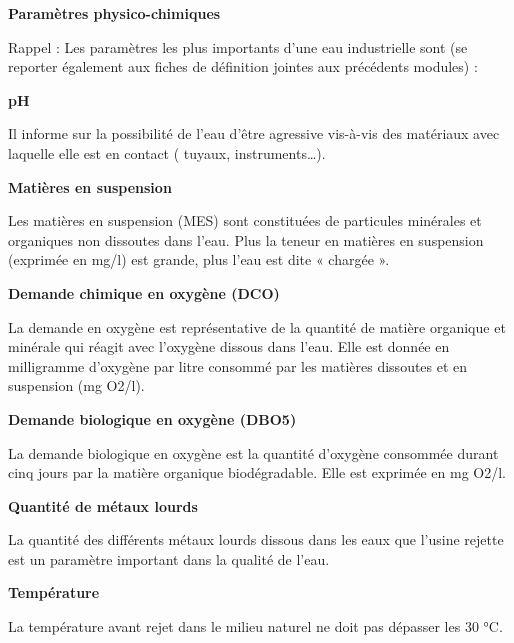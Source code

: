 \vspace{0.3cm}
\textbf{Paramètres physico-chimiques}
\vspace{0.3cm}

Rappel : Les paramètres les plus importants d’une eau industrielle sont (se reporter également aux fiches de définition jointes aux précédents modules) : 

\vspace{0.3cm}
\textbf{pH}
\vspace{0.3cm}

Il informe sur la possibilité de l’eau d’être agressive vis-à-vis des matériaux avec laquelle elle est en contact ( tuyaux, instruments…).


\vspace{0.3cm}
\textbf{Matières en suspension} 
\vspace{0.3cm}

Les matières en suspension (MES) sont constituées de particules minérales et organiques non dissoutes dans l’eau. Plus la teneur en matières en suspension (exprimée en mg/l) est grande, plus l’eau est dite « chargée ».

\vspace{0.3cm}
\textbf{Demande chimique en oxygène (DCO)}
\vspace{0.3cm}

La demande en oxygène est représentative de la quantité de matière organique et minérale qui réagit avec l’oxygène dissous dans l’eau.
Elle est donnée en milligramme d’oxygène par litre consommé par les matières dissoutes et en suspension (mg O2/l).

\vspace{0.3cm}
\textbf{Demande biologique en oxygène (DBO5)}
\vspace{0.3cm}

La demande biologique en oxygène est la quantité d’oxygène consommée durant cinq jours par la matière organique biodégradable. Elle est exprimée en mg O2/l.

 
\vspace{0.3cm}
\textbf{Quantité de métaux lourds}
\vspace{0.3cm}

La quantité des différents métaux lourds dissous dans les eaux que l’usine rejette est un paramètre important dans la qualité de l’eau.

\vspace{0.3cm}
\textbf{Température}
\vspace{0.3cm}

La température avant rejet dans le milieu naturel ne doit pas dépasser les 30 °C.


